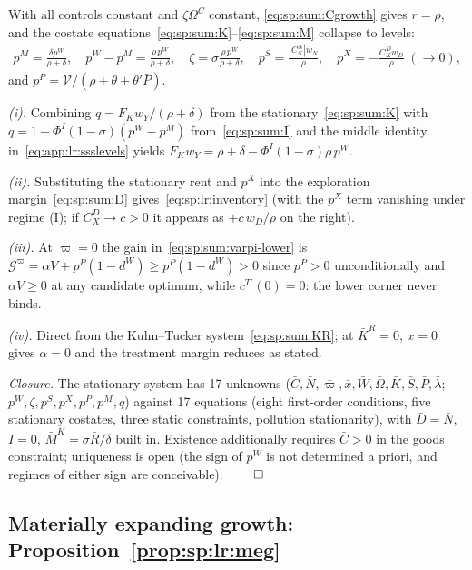 With all controls constant and $\zeta\Omega^C$ constant, \eqref{eq:sp:sum:Cgrowth} gives
$r=\rho$, and the costate equations~\eqref{eq:sp:sum:K}--\eqref{eq:sp:sum:M} collapse to
levels:
\begin{align}
p^M=\frac{\delta p^W}{\rho+\delta},
\quad
p^W-p^M=\frac{\rho\,p^W}{\rho+\delta},
\quad
\zeta=\sigma\frac{\rho\,p^W}{\rho+\delta},
\quad
p^S=\frac{\left|C^N_S\right|w_N}{\rho},
\quad
p^X=-\frac{C^D_Xw_D}{\rho}\;(\to0),
\label{eq:app:lr:ssslevels}
\end{align}
and $p^P=\mathcal V/\left(\rho+\theta+\theta'\bar P\right)$.

\emph{(i).} Combining $q=F_Kw_Y/\left(\rho+\delta\right)$ from the
stationary~\eqref{eq:sp:sum:K} with
$q=1-\Phi^I\left(1-\sigma\right)\left(p^W-p^M\right)$ from~\eqref{eq:sp:sum:I} and the middle
identity in~\eqref{eq:app:lr:ssslevels} yields
$F_Kw_Y=\rho+\delta-\Phi^I\left(1-\sigma\right)\rho\,p^W$.

\emph{(ii).} Substituting the stationary rent and $p^X$ into the exploration
margin~\eqref{eq:sp:sum:D} gives~\eqref{eq:sp:lr:inventory} (with the $p^X$ term vanishing
under regime (I); if $C^D_X\to c>0$ it appears as $+c\,w_D/\rho$ on the right).

\emph{(iii).} At $\varpi=0$ the gain in~\eqref{eq:sp:sum:varpi-lower} is
$\mathcal G^\varpi=\alpha V+p^P\left(1-d^W\right)\ge p^P\left(1-d^W\right)>0$ since $p^P>0$
unconditionally and $\alpha V\ge0$ at any candidate optimum, while
$c^{T\prime}(0)=0$: the lower corner never binds.

\emph{(iv).} Direct from the Kuhn--Tucker system~\eqref{eq:sp:sum:KR}; at $\bar K^R=0$, $x=0$
gives $\alpha=0$ and the treatment margin reduces as stated.

\emph{Closure.} The stationary system has 17 unknowns
($\bar C,\bar N,\bar\varpi,\bar x,\bar W,\bar\Omega,\bar K,\bar S,\bar P,\bar\lambda$;
$p^W,\zeta,p^S,p^X,p^P,p^M,q$) against 17 equations (eight first-order conditions, five
stationary costates, three static constraints, pollution stationarity), with $\bar D=\bar N$,
$I=0$, $\bar M^K=\sigma\bar R/\delta$ built in. Existence additionally requires $\bar C>0$ in
the goods constraint; uniqueness is open (the sign of $p^W$ is not determined a priori, and
regimes of either sign are conceivable). \hfill$\qed$

\subsection{Materially expanding growth: Proposition~\ref{prop:sp:lr:meg}}
\label{sec:app:longrun:meg}

